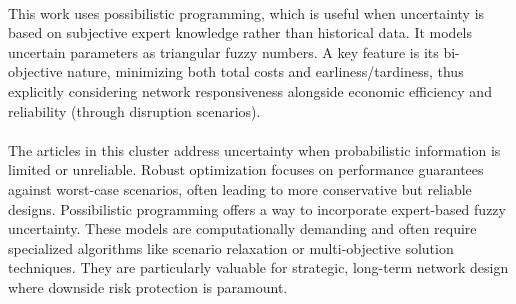 \paragraph{} This work uses possibilistic programming, which is useful when uncertainty is based on subjective expert knowledge rather than historical data. It models uncertain parameters as triangular fuzzy numbers. A key feature is its bi-objective nature, minimizing both total costs and earliness/tardiness, thus explicitly considering network responsiveness alongside economic efficiency and reliability (through disruption scenarios).


\paragraph{} The articles in this cluster address uncertainty when probabilistic information is limited or unreliable. Robust optimization focuses on performance guarantees against worst-case scenarios, often leading to more conservative but reliable designs. Possibilistic programming offers a way to incorporate expert-based fuzzy uncertainty. These models are computationally demanding and often require specialized algorithms like scenario relaxation or multi-objective solution techniques. They are particularly valuable for strategic, long-term network design where downside risk protection is paramount.
